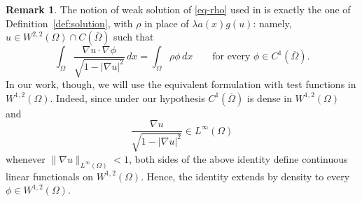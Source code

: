 \documentclass[11pt,reqno]{amsart}
\theoremstyle{plain}
\theoremstyle{definition}
\newtheorem{remark}[theorem]{Remark}
\numberwithin{equation}{section}
\begin{document}
\begin{remark}\label{remark:density}
The notion of weak solution of \eqref{eq-rho} used in \cite{Ma26} is exactly the one of Definition~\ref{def:solution}, with $\rho$ in place of $\lambda a(x) g(u)$: namely, $u \in W^{2,2}(\Omega)\cap C(\overline{\Omega})$ such that
$$
\int_\Omega \frac{\nabla u\cdot\nabla\phi}{\sqrt{1-|\nabla u|^2}}\,dx
=
\int_\Omega \rho\phi\,dx
\qquad\text{for every }\phi\in C^1(\overline{\Omega}).
$$
In our work, though, we will use the equivalent formulation with test functions in $W^{1,2}(\Omega)$. Indeed, since under our hypothesis $C^1(\overline{\Omega})$ is dense in $W^{1,2}(\Omega)$ and
$$
\frac{\nabla u}{\sqrt{1-|\nabla u|^2}}\in L^\infty(\Omega)
$$
whenever $\|\nabla u\|_{L^\infty(\Omega)}<1$, both sides of the above identity define continuous linear functionals on $W^{1,2}(\Omega)$. Hence, the identity extends by density to every $\phi\in W^{1,2}(\Omega)$.
\end{remark}
\end{document}
